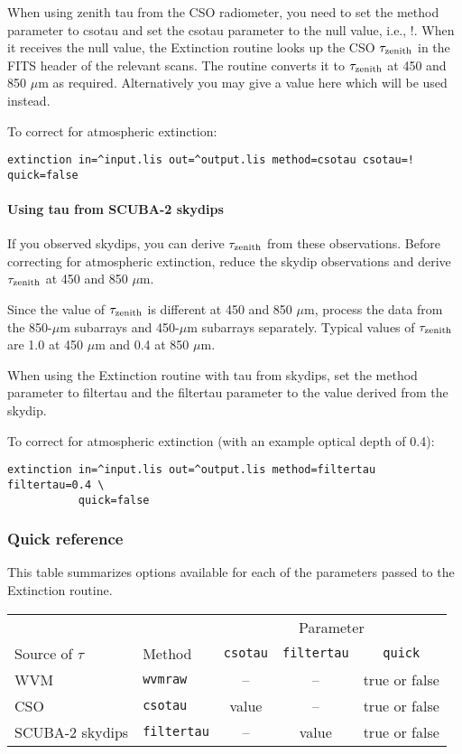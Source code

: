 \documentclass[twoside,11pt]{article}
\renewcommand{\_}{\texttt{\symbol{95}}}
\begin{document}
When using zenith tau from the CSO radiometer, you need to set the
method parameter to csotau and set the csotau parameter to the null
value, i.e., !. When it receives the null value, the Extinction
routine looks up the CSO $\tau_{\rm zenith}$ in the FITS header of the
relevant scans. The routine converts it to $\tau_{\rm zenith}$ at 450
and 850 $\mu$m as required. Alternatively you may give a value here
which will be used instead.

To correct for atmospheric extinction:
\begin{verbatim}
extinction in=^input.lis out=^output.lis method=csotau csotau=! quick=false
\end{verbatim}


\paragraph{Using tau from SCUBA-2 skydips}

If you observed skydips, you can derive $\tau_{\rm zenith}$ from these
observations. Before correcting for atmospheric extinction, reduce the
skydip observations and derive $\tau_{\rm zenith}$ at 450 and 850 $\mu$m.

Since the value of $\tau_{\rm zenith}$ is different at 450 and 850
$\mu$m, process the data from the 850-$\mu$m subarrays and 450-$\mu$m
subarrays separately. Typical values of $\tau_{\rm zenith}$ are 1.0 at
450 $\mu$m and 0.4 at 850 $\mu$m.

When using the Extinction routine with tau from skydips, set the
method parameter to filtertau and the filtertau parameter to the value
derived from the skydip.

To correct for atmospheric extinction (with an example optical depth
of 0.4):
\begin{verbatim}
extinction in=^input.lis out=^output.lis method=filtertau filtertau=0.4 \
           quick=false
\end{verbatim}

\subsubsection{Quick reference}

This table summarizes options available for each of the parameters
passed to the Extinction routine.

\begin{table}
\begin{tabular}{llccc}
\hline
                 &           & \multicolumn{3}{c}{Parameter} \\
Source of $\tau$ & Method    & \verb-csotau- & \verb-filtertau- & \verb-quick- \\
\hline                                               
WVM              & \verb-wvmraw-    &  --     &   --       & true or false \\
CSO              & \verb-csotau-    & value   &   --       & true or false \\
SCUBA-2 skydips  & \verb-filtertau- &  --     & value      & true or false \\
\hline
\end{tabular}
\end{table}
\end{document}
